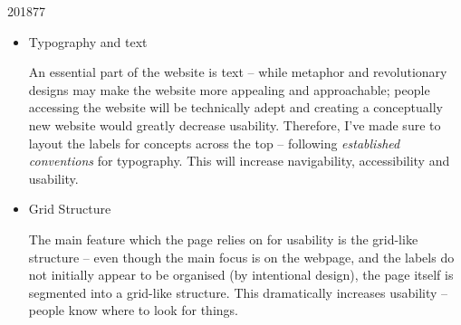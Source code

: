 \documentclass[10pt,\jkfside,a4paper]{article}
\begin{document}
\begin{examquestion}{2018}{7}{7}
\begin{enumerate}
\begin{itemize}
\item Typography and text

An essential part of the website is text -- while metaphor and revolutionary
designs may make the website more appealing and approachable; people
accessing the website will be technically adept and creating a conceptually
new website would greatly decrease usability. Therefore, I've made sure to
layout the labels for concepts across the top -- following
\textit{established conventions} for typography. This will increase
navigability, accessibility and usability.

\item Grid Structure

The main feature which the page relies on for usability is the grid-like
structure -- even though the main focus is on the webpage, and the labels do
not initially appear to be organised (by intentional design), the page
itself is segmented into a grid-like structure. This dramatically increases
usability -- people know where to look for things.

\end{itemize}

\end{enumerate}

\end{examquestion}
\end{document}
